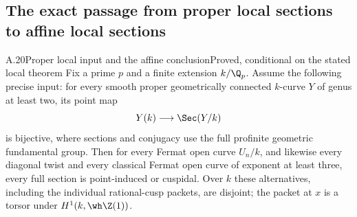 \subsection{The exact passage from proper local sections to affine local sections}

\begin{statement}{A.20}{Proper local input and the affine conclusion}{Proved, conditional on the stated local theorem}
Fix a prime $p$ and a finite extension $k/\Q_p$. Assume the following precise input: for every smooth proper geometrically connected $k$-curve $Y$ of genus at least two, its point map
\[
Y(k)\longrightarrow\Sec(Y/k)
\]
is bijective, where sections and conjugacy use the full profinite geometric fundamental group. Then for every Fermat open curve $U_n/k$, and likewise every diagonal twist and every classical Fermat open curve of exponent at least three, every full section is point-induced or cuspidal. Over $k$ these alternatives, including the individual rational-cusp packets, are disjoint; the packet at $x$ is a torsor under $H^1(k,\wh\Z(1))$.
\end{statement}
